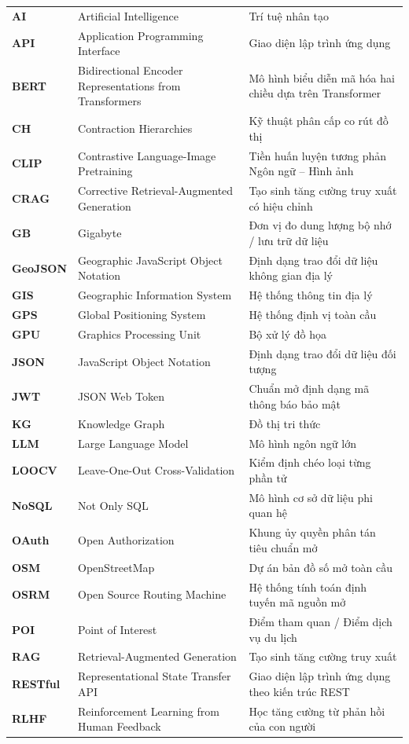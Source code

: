 \begin{longtable}{>{\bfseries}p{2.0cm} >{\raggedright\arraybackslash}p{6.8cm} >{\raggedright\arraybackslash}p{6.4cm}}
AI & Artificial Intelligence & Trí tuệ nhân tạo \\
API & Application Programming Interface & Giao diện lập trình ứng dụng \\
BERT & Bidirectional Encoder Representations from Transformers & Mô hình biểu diễn mã hóa hai chiều dựa trên Transformer \\
CH & Contraction Hierarchies & Kỹ thuật phân cấp co rút đồ thị \\
CLIP & Contrastive Language-Image Pretraining & Tiền huấn luyện tương phản Ngôn ngữ -- Hình ảnh \\
CRAG & Corrective Retrieval-Augmented Generation & Tạo sinh tăng cường truy xuất có hiệu chỉnh \\
GB & Gigabyte & Đơn vị đo dung lượng bộ nhớ / lưu trữ dữ liệu \\
GeoJSON & Geographic JavaScript Object Notation & Định dạng trao đổi dữ liệu không gian địa lý \\
GIS & Geographic Information System & Hệ thống thông tin địa lý \\
GPS & Global Positioning System & Hệ thống định vị toàn cầu \\
GPU & Graphics Processing Unit & Bộ xử lý đồ họa \\
JSON & JavaScript Object Notation & Định dạng trao đổi dữ liệu đối tượng \\
JWT & JSON Web Token & Chuẩn mở định dạng mã thông báo bảo mật \\
KG & Knowledge Graph & Đồ thị tri thức \\
LLM & Large Language Model & Mô hình ngôn ngữ lớn \\
LOOCV & Leave-One-Out Cross-Validation & Kiểm định chéo loại từng phần tử \\
NoSQL & Not Only SQL & Mô hình cơ sở dữ liệu phi quan hệ \\
OAuth & Open Authorization & Khung ủy quyền phân tán tiêu chuẩn mở \\
OSM & OpenStreetMap & Dự án bản đồ số mở toàn cầu \\
OSRM & Open Source Routing Machine & Hệ thống tính toán định tuyến mã nguồn mở \\
POI & Point of Interest & Điểm tham quan / Điểm dịch vụ du lịch \\
RAG & Retrieval-Augmented Generation & Tạo sinh tăng cường truy xuất \\
RESTful & Representational State Transfer API & Giao diện lập trình ứng dụng theo kiến trúc REST \\
RLHF & Reinforcement Learning from Human Feedback & Học tăng cường từ phản hồi của con người \\

\end{longtable}
